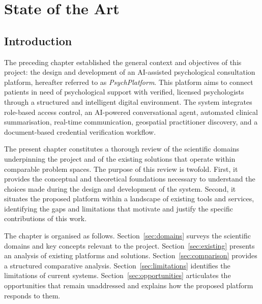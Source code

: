 
\chapter{State of the Art}
\label{chap:soa}

\section*{Introduction}

The preceding chapter established the general context and objectives of this
project: the design and development of an AI-assisted psychological consultation
platform, hereafter referred to as \emph{PsychPlatform}. This platform aims to
connect patients in need of psychological support with verified, licensed
psychologists through a structured and intelligent digital environment. The
system integrates role-based access control, an AI-powered conversational agent,
automated clinical summarisation, real-time communication, geospatial
practitioner discovery, and a document-based credential verification workflow.

The present chapter constitutes a thorough review of the scientific domains
underpinning the project and of the existing solutions that operate within
comparable problem spaces. The purpose of this review is twofold. First, it
provides the conceptual and theoretical foundations necessary to understand the
choices made during the design and development of the system. Second, it situates
the proposed platform within a landscape of existing tools and services,
identifying the gaps and limitations that motivate and justify the specific
contributions of this work.

The chapter is organised as follows. Section~\ref{sec:domains} surveys the
scientific domains and key concepts relevant to the project.
Section~\ref{sec:existing} presents an analysis of existing platforms and
solutions. Section~\ref{sec:comparison} provides a structured comparative
analysis. Section~\ref{sec:limitations} identifies the limitations of current
systems. Section~\ref{sec:opportunities} articulates the opportunities that
remain unaddressed and explains how the proposed platform responds to them.

